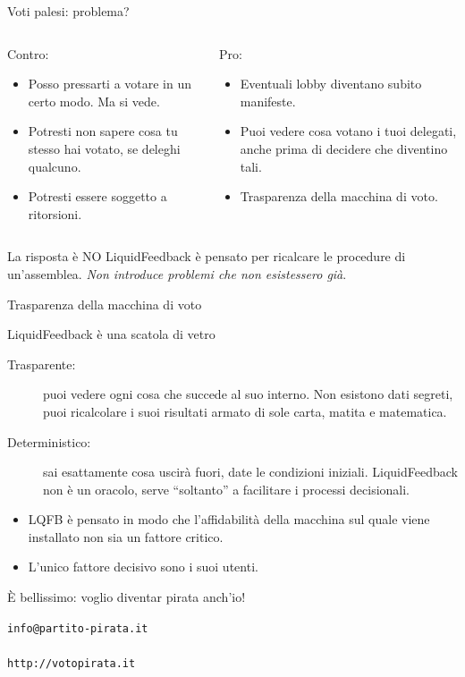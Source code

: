 \begin{frame}{Voti palesi: problema?}
\begin{columns}
\begin{column}[t]{.5\textwidth}

Contro:\begin{itemize}
\item Posso pressarti a votare in un certo modo. Ma si vede.
\item Potresti non sapere cosa tu stesso hai votato, se deleghi qualcuno.
\item Potresti essere soggetto a ritorsioni.
\end{itemize}
\end{column}
\begin{column}[t]{.5\textwidth}

Pro:\begin{itemize}
\item Eventuali lobby diventano subito manifeste.
\item Puoi vedere cosa votano i tuoi delegati, anche prima di decidere che diventino tali.
\item \alert{Trasparenza della macchina di voto}.
\end{itemize}
\end{column}
\end{columns}\pause
\begin{block}{La risposta è NO}
LiquidFeedback è pensato per ricalcare le procedure di un'assemblea. \emph{Non introduce problemi che non esistessero già}.
\end{block}
\end{frame}

\begin{frame}{Trasparenza della macchina di voto}
\begin{block}{LiquidFeedback è una scatola di vetro}
\begin{description}
\item[Trasparente:] puoi vedere ogni cosa che succede al suo interno. Non esistono dati segreti, puoi ricalcolare i suoi risultati armato di sole carta, matita e matematica.
\item[Deterministico:] sai esattamente cosa uscirà fuori, date le condizioni iniziali. LiquidFeedback non è un oracolo, serve ``soltanto'' a facilitare i processi decisionali.
\end{description}
\end{block}
\begin{itemize}
\item LQFB è pensato in modo che l'affidabilità della macchina sul quale viene installato non sia un fattore critico.
\item \alert{L'unico fattore decisivo sono i suoi utenti}.
\end{itemize}
\end{frame}

\begin{frame}{È bellissimo: voglio diventar pirata anch'io!}

\begin{center}
{\huge \texttt{info@partito-pirata.it \\~\\ http://votopirata.it}}
\end{center}

\end{frame}

